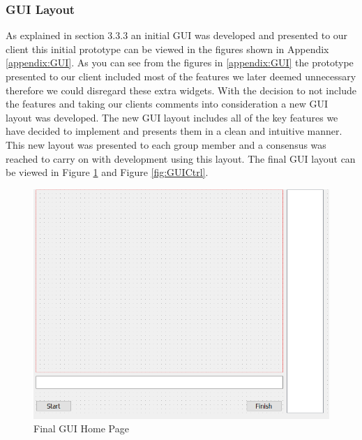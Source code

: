 \subsubsection{GUI Layout}
As explained in section 3.3.3 an initial GUI was developed and presented to our client this initial prototype can be viewed in the figures shown in Appendix \ref{appendix:GUI}. As you can see from the figures in \ref{appendix:GUI} the prototype presented to our client included most of the features we later deemed unnecessary therefore we could disregard these extra widgets. With the decision to not include the features and taking our clients comments into consideration a new GUI layout was developed. The new GUI layout includes all of the key features we have decided to implement and presents them in a clean and intuitive manner. This new layout was presented to each group member and a consensus was reached to carry on with development using this layout. The final GUI layout can be viewed in Figure \ref{fig:GUIHome} and Figure \ref{fig:GUICtrl}.
\begin{figure}[H]
	\includegraphics[width=\linewidth]{Final_GUI_HOME.png}
	\caption{Final GUI Home Page}
	\label{fig:GUIHome}
\end{figure}
